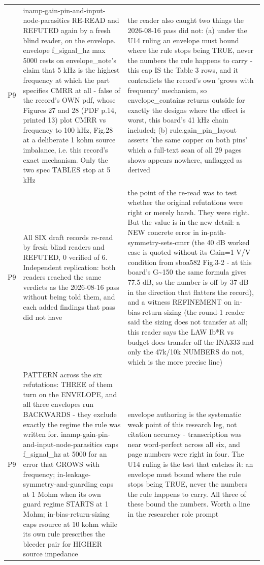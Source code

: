 \documentclass[11pt,a4paper]{article}
\begin{document}
{\begin{longtable}{lp{5.2cm}p{7.2cm}}
P9 & inamp-gain-pin-and-input-node-parasitics RE-READ and REFUTED again by a fresh blind reader, on the envelope. envelope f\_signal\_hz max 5000 rests on envelope\_note's claim that 5 kHz is the highest frequency at which the part specifies CMRR at all - false of the record's OWN pdf, whose Figures 27 and 28 (PDF p.14, printed 13) plot CMRR vs frequency to 100 kHz, Fig.28 at a deliberate 1 kohm source imbalance, i.e. this record's exact mechanism. Only the two spec TABLES stop at 5 kHz & the reader also caught two things the 2026-08-16 pass did not: (a) under the U14 ruling an envelope must bound where the rule stops being TRUE, never the numbers the rule happens to carry - this cap IS the Table 3 rows, and it contradicts the record's own 'grows with frequency' mechanism, so envelope\_contains returns outside for exactly the designs where the effect is worst, this board's 41 kHz chain included; (b) rule.gain\_pin\_layout asserts 'the same copper on both pins' which a full-text scan of all 29 pages shows appears nowhere, unflagged as derived \\
P9 & All SIX draft records re-read by fresh blind readers and REFUTED, 0 verified of 6. Independent replication: both readers reached the same verdicts as the 2026-08-16 pass without being told them, and each added findings that pass did not have & the point of the re-read was to test whether the original refutations were right or merely harsh. They were right. But the value is in the new detail: a NEW concrete error in in-path-symmetry-sets-cmrr (the 40 dB worked case is quoted without its Gain=1 V/V condition from sboa582 Fig.3-2 - at this board's G\textasciitilde{}150 the same formula gives 77.5 dB, so the number is off by 37 dB in the direction that flatters the record), and a witness REFINEMENT on in-bias-return-sizing (the round-1 reader said the sizing does not transfer at all; this reader says the LAW Ib{*}R vs budget does transfer off the INA333 and only the 47k/10k NUMBERS do not, which is the more precise line) \\
P9 & PATTERN across the six refutations: THREE of them turn on the ENVELOPE, and all three envelopes run BACKWARDS - they exclude exactly the regime the rule was written for. inamp-gain-pin-and-input-node-parasitics caps f\_signal\_hz at 5000 for an error that GROWS with frequency; in-leakage-symmetry-and-guarding caps at 1 Mohm when its own guard regime STARTS at 1 Mohm; in-bias-return-sizing caps rsource at 10 kohm while its own rule prescribes the bleeder pair for HIGHER source impedance & envelope authoring is the systematic weak point of this research leg, not citation accuracy - transcription was near word-perfect across all six, and page numbers were right in four. The U14 ruling is the test that catches it: an envelope must bound where the rule stops being TRUE, never the numbers the rule happens to carry. All three of these bound the numbers. Worth a line in the researcher role prompt \\

\end{longtable}}
\end{document}

